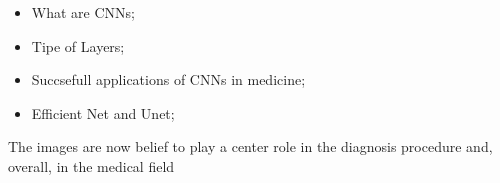 \documentclass[../main.tex]{subfiles}
\begin{document}
\begin{itemize}

    \item What are CNNs;
    \item Tipe of Layers;
    \item Succsefull applications of CNNs in medicine;
    \item Efficient Net and Unet;
   
\end{itemize}
The images are now belief to play a center role in the diagnosis procedure and, overall, in the medical field
\end{document}
